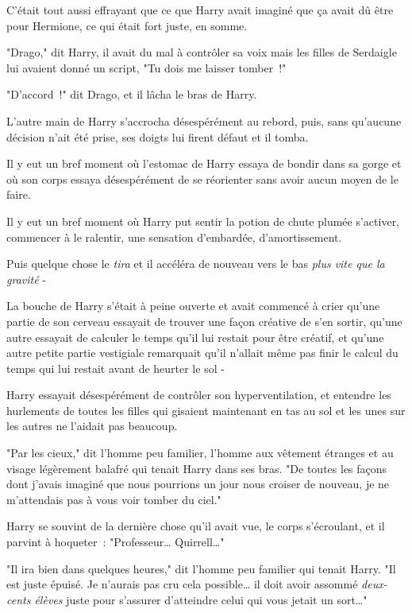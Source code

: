 C'était tout aussi effrayant que ce que Harry avait imaginé que ça avait dû être pour Hermione, ce qui était fort juste, en somme.

"Drago," dit Harry, il avait du mal à contrôler sa voix mais les filles de Serdaigle lui avaient donné un script, "Tu dois me laisser tomber~!"

"D'accord~!" dit Drago, et il lâcha le bras de Harry.

L'autre main de Harry s'accrocha désespérément au rebord, puis, sans qu'aucune décision n'ait été prise, ses doigts lui firent défaut et il tomba.

Il y eut un bref moment où l'estomac de Harry essaya de bondir dans sa gorge et où son corps essaya désespérément de se réorienter sans avoir aucun moyen de le faire.

Il y eut un bref moment où Harry put sentir la potion de chute plumée s'activer, commencer à le ralentir, une sensation d'embardée, d'amortissement.

Puis quelque chose le \emph{tira} et il accéléra de nouveau vers le bas \emph{plus vite que la gravité} -

La bouche de Harry s'était à peine ouverte et avait commencé à crier qu'une partie de son cerveau essayait de trouver une façon créative de s'en sortir, qu'une autre essayait de calculer le temps qu'il lui restait pour être créatif, et qu'une autre petite partie vestigiale remarquait qu'il n'allait même pas finir le calcul du temps qui lui restait avant de heurter le sol -

\later

Harry essayait désespérément de contrôler son hyperventilation, et entendre les hurlements de toutes les filles qui gisaient maintenant en tas au sol et les unes sur les autres ne l'aidait pas beaucoup.

"Par les cieux," dit l'homme peu familier, l'homme aux vêtement étranges et au visage légèrement balafré qui tenait Harry dans ses bras. "De toutes les façons dont j'avais imaginé que nous pourrions un jour nous croiser de nouveau, je ne m'attendais pas à vous voir tomber du ciel."

Harry se souvint de la dernière chose qu'il avait vue, le corps s'écroulant, et il parvint à hoqueter~: "Professeur… Quirrell…"

"Il ira bien dans quelques heures," dit l'homme peu familier qui tenait Harry. "Il est juste épuisé. Je n'aurais pas cru cela possible… il doit avoir assommé \emph{deux-cents élèves} juste pour s'assurer d'atteindre celui qui vous jetait un sort…"

